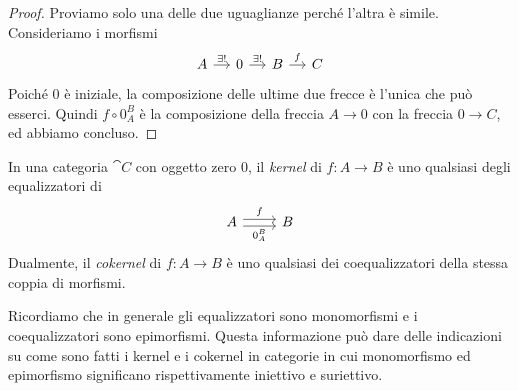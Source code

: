 \begin{proof}
  Proviamo solo una delle due uguaglianze perché l'altra è
  simile. Consideriamo i morfismi
  \[
    \begin{tikzcd}[column sep=small]
      A \ar["{\exists!}", r] & 0 \ar["{\exists!}", r] & B \ar["f", r] & C
    \end{tikzcd}
  \]
  Poiché \(0\) è iniziale, la composizione delle ultime due frecce è
  l'unica che può esserci. Quindi \(f \circ 0_A^B\) è la composizione della
  freccia \(A \to 0\) con la freccia \(0 \to C\), ed abbiamo concluso.
\end{proof}

\begin{definition}
  In una categoria \(\cat C\) con oggetto zero \(0\), il {\em kernel} di
  \(f : A \to B\) è uno qualsiasi degli equalizzatori di
  \[
    \begin{tikzcd}
      A \ar["f", shift left, r] \ar["{0_A^B}", shift right, swap, r] & B
    \end{tikzcd}
  \]
  Dualmente, il {\em cokernel} di \(f : A \to B\) è uno qualsiasi dei
  coequalizzatori della stessa coppia di morfismi.
\end{definition}

\begin{remark}
  Ricordiamo che in generale gli equalizzatori sono monomorfismi e i
  coequalizzatori sono epimorfismi. Questa informazione può dare delle
  indicazioni su come sono fatti i kernel e i cokernel in categorie in
  cui monomorfismo ed epimorfismo significano rispettivamente iniettivo
  e suriettivo.
\end{remark}


